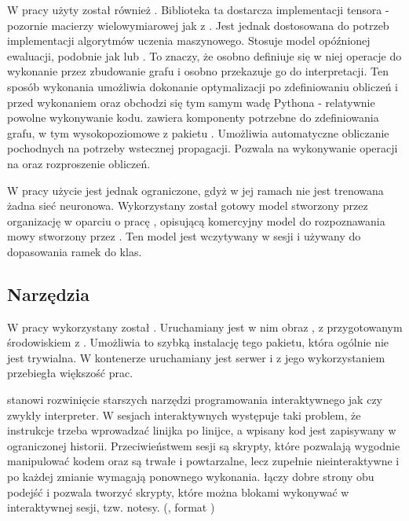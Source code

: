 W pracy użyty został również . Biblioteka ta dostarcza
implementacji tensora - pozornie macierzy wielowymiarowej jak z . Jest jednak
dostosowana do potrzeb implementacji algorytmów uczenia maszynowego. Stosuje model opóźnionej
ewaluacji, podobnie jak  lub . To znaczy, że
osobno definiuje się w niej operacje do wykonanie przez zbudowanie grafu i osobno przekazuje go do interpretacji.
Ten sposób wykonania umożliwia dokonanie optymalizacji po zdefiniowaniu obliczeń i przed wykonaniem oraz
obchodzi się tym samym wadę Pythona - relatywnie powolne wykonywanie kodu.
 zawiera komponenty potrzebne do zdefiniowania grafu, w tym wysokopoziomowe
z pakietu . Umożliwia automatyczne obliczanie pochodnych na potrzeby wstecznej propagacji.
Pozwala na wykonywanie operacji na  oraz rozproszenie obliczeń.

W pracy użycie  jest jednak ograniczone, gdyż w jej ramach nie jest trenowana żadna
sieć neuronowa. Wykorzystany został gotowy model stworzony przez organizację  w oparciu o
pracę \cite{deepSpeechScaling}, opisującą komercyjny model do rozpoznawania mowy stworzony
przez . Ten model jest wczytywany w sesji  i używany do dopasowania
ramek do klas.

\subsection{Narzędzia}

W pracy wykorzystany został . Uruchamiany jest w nim obraz ,
z przygotowanym środowiskiem z . Umożliwia to szybką instalację tego pakietu, która ogólnie nie
jest trywialna. W kontenerze uruchamiany jest serwer  i z jego wykorzystaniem przebiegła większość prac.

 stanowi rozwinięcie starszych narzędzi programowania interaktywnego jak  czy zwykły  interpreter. W sesjach interaktywnych występuje taki problem, że instrukcje trzeba wprowadzać linijka po linijce, a wpisany kod jest zapisywany w ograniczonej historii. Przeciwieństwem sesji są skrypty, które pozwalają wygodnie manipulować
kodem oraz są trwałe i powtarzalne, lecz zupełnie nieinteraktywne i po każdej zmianie wymagają ponownego wykonania.
 łączy dobre strony obu podejść i pozwala tworzyć skrypty, które można blokami wykonywać
w interaktywnej sesji, tzw. notesy. (, format )

